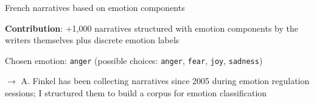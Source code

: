 \documentclass[handout,10pt]{beamer}
\begin{document}
\begin{frame}{French narratives based on emotion components}

\textbf{Contribution}: +1,000 narratives structured with emotion components by the writers themselves plus discrete emotion labels


\begin{table}
    \centering
\label{tab:description_corpus}
\end{table} %

\small
\vspace{0.25cm}

Chosen emotion: \texttt{anger} (possible choices: \texttt{anger}, \texttt{fear}, \texttt{joy}, \texttt{sadness})

\vspace{0.25cm}
\pause

$\rightarrow$ A. Finkel has been collecting narratives since 2005 during emotion regulation sessions; I structured them to build a corpus for emotion classification



    
\end{frame}
\end{document}
